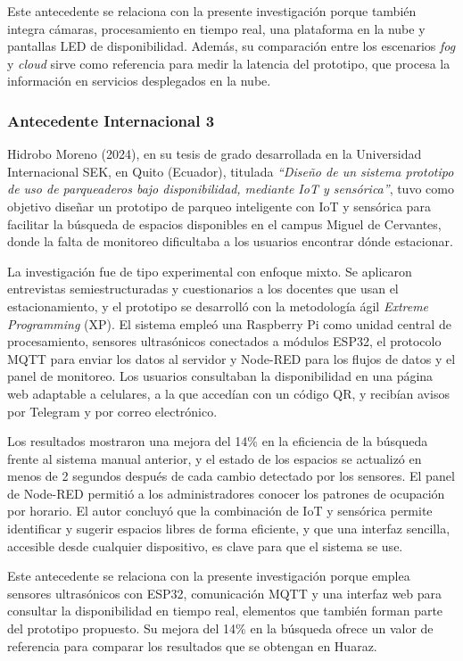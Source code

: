 \documentclass[12pt,a4paper]{article}
\begin{document}
Este antecedente se relaciona con la presente investigación porque también integra cámaras, procesamiento en tiempo real, una plataforma en la nube y pantallas LED de disponibilidad. Además, su comparación entre los escenarios \textit{fog} y \textit{cloud} sirve como referencia para medir la latencia del prototipo, que procesa la información en servicios desplegados en la nube.

\subsubsection{Antecedente Internacional 3}

Hidrobo Moreno (2024), en su tesis de grado desarrollada en la Universidad Internacional SEK, en Quito (Ecuador), titulada \textit{``Diseño de un sistema prototipo de uso de parqueaderos bajo disponibilidad, mediante IoT y sensórica''}, tuvo como objetivo diseñar un prototipo de parqueo inteligente con IoT y sensórica para facilitar la búsqueda de espacios disponibles en el campus Miguel de Cervantes, donde la falta de monitoreo dificultaba a los usuarios encontrar dónde estacionar.

La investigación fue de tipo experimental con enfoque mixto. Se aplicaron entrevistas semiestructuradas y cuestionarios a los docentes que usan el estacionamiento, y el prototipo se desarrolló con la metodología ágil \textit{Extreme Programming} (XP). El sistema empleó una Raspberry Pi como unidad central de procesamiento, sensores ultrasónicos conectados a módulos ESP32, el protocolo MQTT para enviar los datos al servidor y Node-RED para los flujos de datos y el panel de monitoreo. Los usuarios consultaban la disponibilidad en una página web adaptable a celulares, a la que accedían con un código QR, y recibían avisos por Telegram y por correo electrónico.

Los resultados mostraron una mejora del 14\% en la eficiencia de la búsqueda frente al sistema manual anterior, y el estado de los espacios se actualizó en menos de 2 segundos después de cada cambio detectado por los sensores. El panel de Node-RED permitió a los administradores conocer los patrones de ocupación por horario. El autor concluyó que la combinación de IoT y sensórica permite identificar y sugerir espacios libres de forma eficiente, y que una interfaz sencilla, accesible desde cualquier dispositivo, es clave para que el sistema se use.

Este antecedente se relaciona con la presente investigación porque emplea sensores ultrasónicos con ESP32, comunicación MQTT y una interfaz web para consultar la disponibilidad en tiempo real, elementos que también forman parte del prototipo propuesto. Su mejora del 14\% en la búsqueda ofrece un valor de referencia para comparar los resultados que se obtengan en Huaraz.
\end{document}
